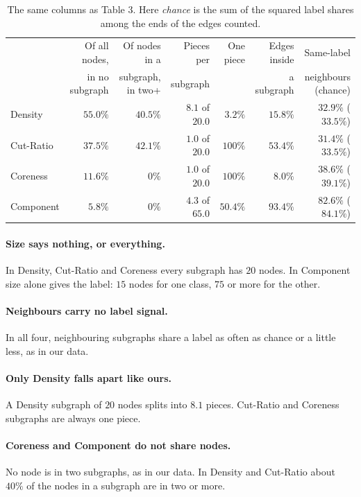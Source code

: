 \documentclass[11pt]{article}
\begin{document}
\begin{table}[H]
\centering
\small
\setlength{\tabcolsep}{3pt}
\begin{tabular}{lrrrrrr}
\toprule
 & Of all nodes, & Of nodes in a & Pieces per & One piece & Edges inside & Same-label \\
 & in no subgraph & subgraph, in two+ & subgraph & & a subgraph & neighbours (chance) \\
\midrule
Density & $55.0\%$ & $40.5\%$ & $8.1$ of $20.0$ & $3.2\%$ & $15.8\%$ & $32.9\%$ ($33.5\%$) \\
Cut-Ratio & $37.5\%$ & $42.1\%$ & $1.0$ of $20.0$ & $100\%$ & $53.4\%$ & $31.4\%$ ($33.5\%$) \\
Coreness & $11.6\%$ & $0\%$ & $1.0$ of $20.0$ & $100\%$ & $8.0\%$ & $38.6\%$ ($39.1\%$) \\
Component & $5.8\%$ & $0\%$ & $4.3$ of $65.0$ & $50.4\%$ & $93.4\%$ & $82.6\%$ ($84.1\%$) \\
\bottomrule
\end{tabular}
\caption{The same columns as Table 3. Here \emph{chance} is the sum of the squared label
shares among the ends of the edges counted.}
\end{table}

\paragraph{Size says nothing, or everything.} In Density, Cut-Ratio and Coreness every
subgraph has $20$ nodes. In Component size alone gives the label: $15$ nodes for one class,
$75$ or more for the other.

\paragraph{Neighbours carry no label signal.} In all four, neighbouring subgraphs share a
label as often as chance or a little less, as in our data.

\paragraph{Only Density falls apart like ours.} A Density subgraph of $20$ nodes splits into
$8.1$ pieces. Cut-Ratio and Coreness subgraphs are always one piece.

\paragraph{Coreness and Component do not share nodes.} No node is in two subgraphs, as in
our data. In Density and Cut-Ratio about $40\%$ of the nodes in a subgraph are in two or
more.
\end{document}
